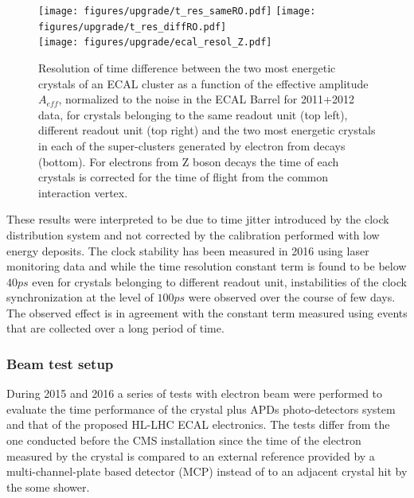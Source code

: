 \begin{figure}[h!]
  \centering
  \texttt{[image: figures/upgrade/t\_res\_sameRO.pdf]}
  \texttt{[image: figures/upgrade/t\_res\_diffRO.pdf]}\\
  \texttt{[image: figures/upgrade/ecal\_resol\_Z.pdf]}
  \caption{Resolution of time difference between the two most energetic crystals of an ECAL cluster as a function of the
    effective amplitude $A_{eff}$, normalized to the noise in the ECAL Barrel for 2011+2012 data,
    for crystals belonging to the same readout unit (top left), different readout unit (top right) and the two most
    energetic crystals in each of the super-clusters generated by electron from \Zee decays (bottom).
    For electrons from Z boson decays the time of each crystals is corrected for the time of flight from the common
  interaction vertex.}
  \label{fig:ecal_runI_time}
\end{figure}

These results were interpreted to be due to time jitter introduced by the clock distribution system and not corrected by
the calibration performed with low energy deposits. The clock stability has been measured in 2016 using laser monitoring data
and while the time resolution constant term is found to be below $40 ps$ even for crystals belonging to different readout unit,
instabilities of the clock synchronization at the level of $100 ps$ were observed over the course of few days. The
observed effect is in agreement with the constant term measured using \Zee events that are collected over a long period of time.

\subsubsection{Beam test setup}
\label{sec:tb_2015}
During 2015 and 2016 a series of tests with electron beam were performed to evaluate the time performance
of the \PbWO crystal plus APDs photo-detectors system and that of the proposed HL-LHC ECAL electronics.
The tests differ from the one conducted before the CMS installation since the time of the electron measured by the
crystal is compared to an external reference provided by a multi-channel-plate based detector (MCP) instead of to an adjacent
crystal hit by the some shower.

